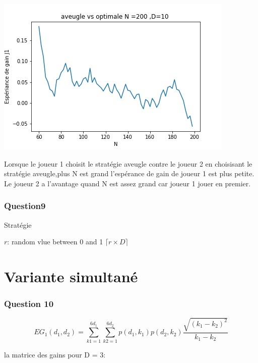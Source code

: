 \documentclass[12pt,a4paper]{article}
\begin{document}
\begin{center}
\includegraphics{a_vs_o.png}
\end{center}

Lorsque le joueur 1 choisit le stratégie aveugle contre le joueur 2 en choisisant le stratégie aveugle,plus N est grand l'espérance de gain de joueur 1 est plus petite. Le joueur 2 a l'avantage quand N est assez grand car joueur 1 jouer en premier. 
 
\subsubsection{Question9}
\begin{algorithm}
\caption{Stratégie}
\begin{algorithmic}[1]
	\State $r$: random vlue between 0 and 1 	
    \State \Return $\lceil r \times D\rceil$ 
\EndFunction
\end{algorithmic}
\end{algorithm}

\section{Variante simultané}
\subsubsection{Question 10}

\begin{equation}\nonumber
EG_{1}(d_{1},d_{2})=\sum\limits_{k1=1}^{6d_{1}}\sum\limits_{k2=1}^{6d_{2}}p(d_{1},k_{1})p(d_{2},k_{2})\frac{\sqrt{(k_{1}-k_{2})^{2}}}{k_{1}-k_{2}}
\end{equation}

la matrice des gains pour D = 3:\\
\end{document}
